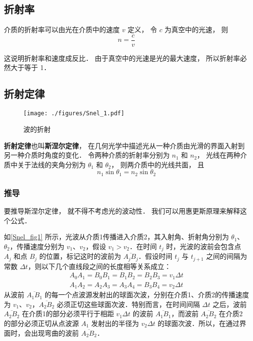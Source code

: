
\subsection{折射率}
介质的折射率可以由光在介质中的速度 $v$ 定义， 令 $c$ 为真空中的光速， 则
\begin{equation}
n = \frac{c}{v}
\end{equation} 

这说明折射率和速度成反比． 由于真空中的光速是光的最大速度， 所以折射率必然大于等于 1．

\subsection{折射定律}
\begin{figure}[ht]
\centering
\texttt{[image: ./figures/Snel\_1.pdf]}
\caption{波的折射} \label{Snel_fig1}
\end{figure}
\textbf{折射定律}也叫\textbf{斯涅尔定律}， 在几何光学中描述光从一种介质由光滑的界面入射到另一种介质时角度的变化． 令两种介质的折射率分别为 $n_1$ 和 $n_2$， 光线在两种介质中关于法线的夹角分别为 $\theta_1$ 和 $\theta_2$， 则两介质中的光线共面， 且
\begin{equation}
n_1 \sin\theta_1 = n_2 \sin\theta_2
\end{equation}


\subsubsection{推导}
要推导斯涅尔定律， 就不得不考虑光的波动性． 我们可以用惠更斯原理来解释这个公式．

如\autoref{Snel_fig1} 所示，光波从介质1传播进入介质2，其入射角、折射角分别为 $\theta_1$、$\theta_2$，传播速度分别为 $v_1$、$v_2$，假设 $v_1>v_2$．在时间 $t_{j}$ 时，光波的波前会包含点 $A_{j}$ 和点 $B_{j}$ 的位置，标记这时的波前为 $\overline {A_{j}B_{j}}$．假设时间 $t_{j}$ 与 $t_{{j+1}}$ 之间的间隔为常数 $\Delta t$，则以下几个直线段之间的长度相等关系成立：
\begin{equation}
\begin{aligned}
A_{0}A_{1}=B_{0}B_{1}=B_{1}B_{2}=B_{2}B_{3}=v_{1}\Delta t \\
A_{1}A_{2}=A_{2}A_{3}=A_{3}A_{4}=B_{3}B_{4}=v_{2}\Delta t
\end{aligned}
\end{equation}
从波前 $\overline {A_{1}B_{1}}$ 的每一个点波源发射出的球面次波，分别在介质1、介质2的传播速度为 $v_1$、$v_2$，$\overline {A_{2}B_{2}}$ 必须正切这些球面次波．特别而言，在时间间隔 $\Delta t$ 之后，波前 $\overline {A_{2}B_{2}}$ 在介质1的部分必须平行于相距 $v_{1}\Delta t$ 的波前 $\overline {A_{1}B_{1}}$，而波前 $\overline {A_{2}B_{2}}$ 在介质2的部分必须正切从点波源 $A_{1}$ 发射出的半径为 $v_{2}\Delta t$ 的球面次波．所以，在通过界面时，会出现弯曲的波前 $\overline {A_{2}B_{2}}$．

